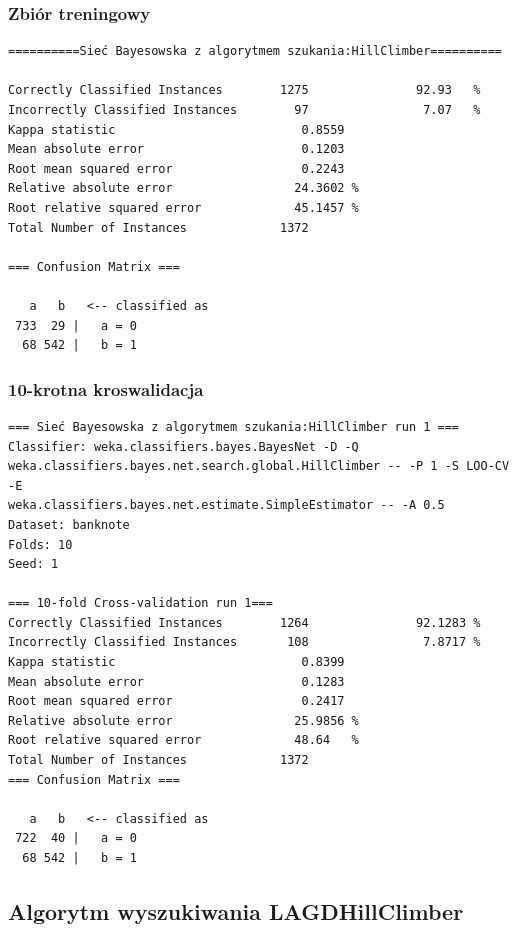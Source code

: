 \documentclass{classrep}
\begin{document}
\subsubsection*{Zbiór treningowy}
\scriptsize 
\begin{verbatim}
==========Sieć Bayesowska z algorytmem szukania:HillClimber==========

Correctly Classified Instances        1275               92.93   %
Incorrectly Classified Instances        97                7.07   %
Kappa statistic                          0.8559
Mean absolute error                      0.1203
Root mean squared error                  0.2243
Relative absolute error                 24.3602 %
Root relative squared error             45.1457 %
Total Number of Instances             1372     

=== Confusion Matrix ===

   a   b   <-- classified as
 733  29 |   a = 0
  68 542 |   b = 1
\end{verbatim} 
\normalsize
\subsubsection*{10-krotna kroswalidacja}
\scriptsize 
\begin{verbatim}
=== Sieć Bayesowska z algorytmem szukania:HillClimber run 1 ===
Classifier: weka.classifiers.bayes.BayesNet -D -Q
weka.classifiers.bayes.net.search.global.HillClimber -- -P 1 -S LOO-CV -E
weka.classifiers.bayes.net.estimate.SimpleEstimator -- -A 0.5
Dataset: banknote
Folds: 10
Seed: 1

=== 10-fold Cross-validation run 1===
Correctly Classified Instances        1264               92.1283 %
Incorrectly Classified Instances       108                7.8717 %
Kappa statistic                          0.8399
Mean absolute error                      0.1283
Root mean squared error                  0.2417
Relative absolute error                 25.9856 %
Root relative squared error             48.64   %
Total Number of Instances             1372     
=== Confusion Matrix ===

   a   b   <-- classified as
 722  40 |   a = 0
  68 542 |   b = 1
\end{verbatim} 
\normalsize

\subsection{Algorytm wyszukiwania LAGDHillClimber}
\end{document}
